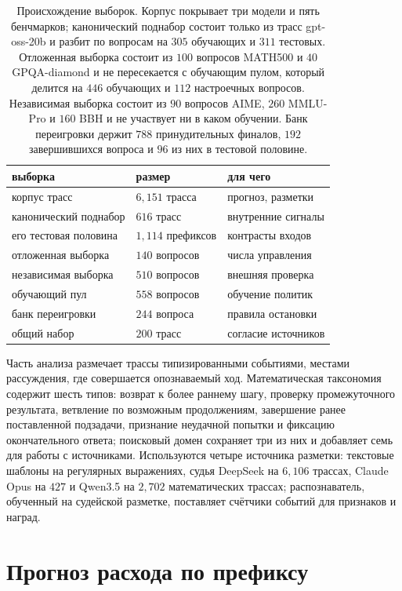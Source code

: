 \documentclass[11pt]{article}
\begin{document}
\begin{table}[t]
\centering
\small
\begin{tabular}{lll}
\toprule
выборка & размер & для чего \\
\midrule
корпус трасс & $6{,}151$ трасса & прогноз, разметки \\
канонический поднабор & $616$ трасс & внутренние сигналы \\
его тестовая половина & $1{,}114$ префиксов & контрасты входов \\
отложенная выборка & $140$ вопросов & числа управления \\
независимая выборка & $510$ вопросов & внешняя проверка \\
обучающий пул & $558$ вопросов & обучение политик \\
банк переигровки & $244$ вопроса & правила остановки \\
общий набор & $200$ трасс & согласие источников \\
\bottomrule
\end{tabular}
\caption{Происхождение выборок. Корпус покрывает три модели и пять бенчмарков; канонический поднабор состоит только из трасс gpt-oss-20b и разбит по вопросам на $305$ обучающих и $311$ тестовых. Отложенная выборка состоит из $100$ вопросов MATH500 и $40$ GPQA-diamond и не пересекается с обучающим пулом, который делится на $446$ обучающих и $112$ настроечных вопросов. Независимая выборка состоит из $90$ вопросов AIME, $260$ MMLU-Pro и $160$ BBH и не участвует ни в каком обучении. Банк переигровки держит $788$ принудительных финалов, $192$ завершившихся вопроса и $96$ из них в тестовой половине.}
\label{tab:lineage}
\end{table}

Часть анализа размечает трассы типизированными событиями, местами рассуждения, где совершается опознаваемый ход. Математическая таксономия содержит шесть типов: возврат к более раннему шагу, проверку промежуточного результата, ветвление по возможным продолжениям, завершение ранее поставленной подзадачи, признание неудачной попытки и фиксацию окончательного ответа; поисковый домен сохраняет три из них и добавляет семь для работы с источниками. Используются четыре источника разметки: текстовые шаблоны на регулярных выражениях, судья DeepSeek на $6{,}106$ трассах, Claude Opus на $427$ и Qwen3.5 на $2{,}702$ математических трассах; распознаватель, обученный на судейской разметке, поставляет счётчики событий для признаков и наград.

\section{Прогноз расхода по префиксу}
\label{sec:predict}
\end{document}
